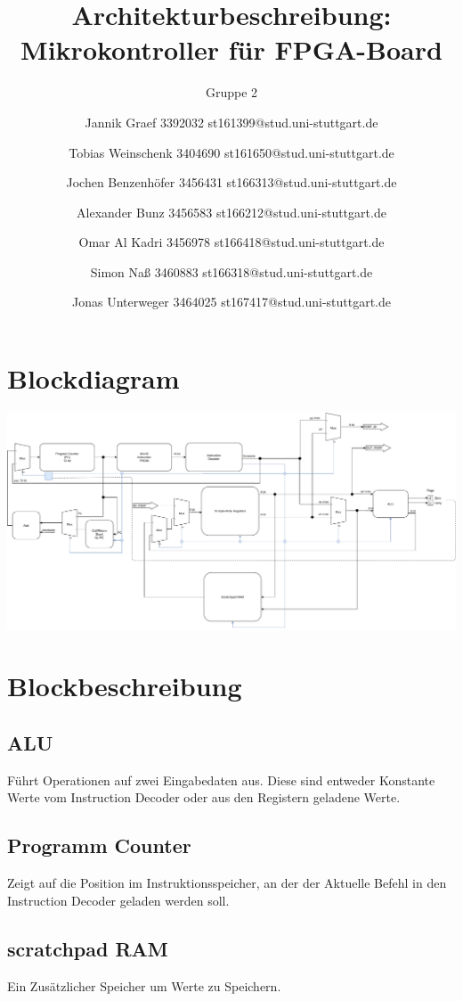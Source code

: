 \documentclass{scrartcl}
\begin{document}
\title{Architekturbeschreibung: Mikrokontroller für FPGA-Board}
\subtitle{Gruppe 2}
\author{Jannik Graef 3392032 st161399@stud.uni-stuttgart.de \and
 Tobias Weinschenk 3404690 st161650@stud.uni-stuttgart.de \and
 Jochen Benzenhöfer 3456431 st166313@stud.uni-stuttgart.de \and
 Alexander Bunz 3456583 st166212@stud.uni-stuttgart.de \and
 Omar Al Kadri 3456978 st166418@stud.uni-stuttgart.de \and
 Simon Naß 3460883 st166318@stud.uni-stuttgart.de \and
 Jonas Unterweger 3464025 st167417@stud.uni-stuttgart.de}
\maketitle


\section{Blockdiagram}
    \includegraphics[width=\textwidth, angle=0]{Blockdiagram.pdf}


\section{Blockbeschreibung}
\subsection{ALU}
Führt Operationen auf zwei Eingabedaten aus. Diese sind entweder Konstante Werte vom Instruction Decoder oder aus den Registern geladene Werte.
\subsection{Programm Counter}
Zeigt auf die Position im Instruktionsspeicher, an der der Aktuelle Befehl in den Instruction Decoder geladen werden soll.
\subsection{scratchpad RAM}
Ein Zusätzlicher Speicher um Werte zu Speichern.
\end{document}

